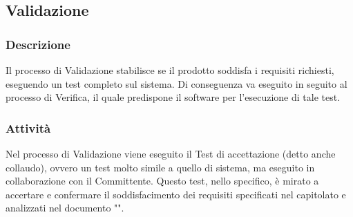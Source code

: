 
  \subsection{Validazione}
    \subsubsection{Descrizione}
      Il processo di Validazione stabilisce se il prodotto soddisfa i requisiti richiesti, eseguendo un test completo sul sistema. Di conseguenza va eseguito in seguito al processo di Verifica, il quale predispone il software per l'esecuzione di tale test.

    \subsubsection{Attività}
        Nel processo di Validazione viene eseguito il Test di accettazione (detto anche collaudo), ovvero un test molto simile a quello di sistema, ma eseguito in collaborazione con il Committente. Questo test, nello specifico, è mirato a accertare e confermare il soddisfacimento dei requisiti specificati nel capitolato e analizzati nel documento "\AdR{}".
